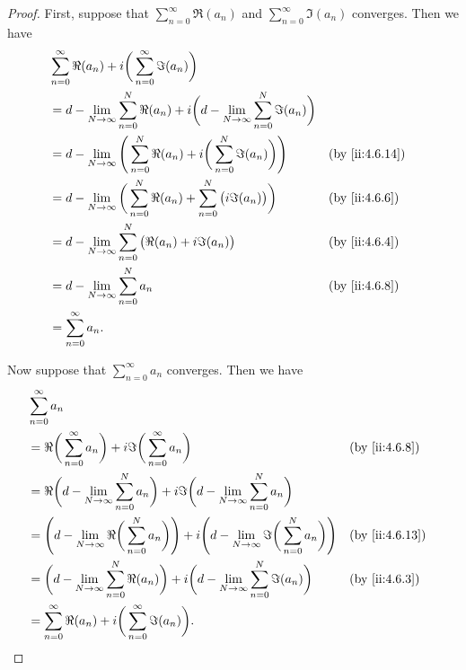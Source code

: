 \begin{proof}
  First, suppose that \(\sum_{n = 0}^\infty \Re(a_n)\) and \(\sum_{n = 0}^\infty \Im(a_n)\) converges.
  Then we have
  \begin{align*}
     & \sum_{n = 0}^\infty \Re(a_n) + i \bigg(\sum_{n = 0}^\infty \Im(a_n)\bigg)                                                             \\
     & = d - \lim_{N \to \infty} \sum_{n = 0}^N \Re(a_n) + i \bigg(d - \lim_{N \to \infty} \sum_{n = 0}^N \Im(a_n)\bigg)                     \\
     & = d - \lim_{N \to \infty} \Bigg(\sum_{n = 0}^N \Re(a_n) + i \bigg(\sum_{n = 0}^N \Im(a_n)\bigg)\Bigg)             &  & \by{ii:4.6.14} \\
     & = d - \lim_{N \to \infty} \bigg(\sum_{n = 0}^N \Re(a_n) + \sum_{n = 0}^N \big(i \Im(a_n)\big)\bigg)               &  & \by{ii:4.6.6}  \\
     & = d - \lim_{N \to \infty} \sum_{n = 0}^N \big(\Re(a_n) + i \Im(a_n)\big)                                          &  & \by{ii:4.6.4}  \\
     & = d - \lim_{N \to \infty} \sum_{n = 0}^N a_n                                                                      &  & \by{ii:4.6.8}  \\
     & = \sum_{n = 0}^\infty a_n.
  \end{align*}

  Now suppose that \(\sum_{n = 0}^\infty a_n\) converges.
  Then we have
  \begin{align*}
     & \sum_{n = 0}^\infty a_n                                                                                                                                               \\
     & = \Re\bigg(\sum_{n = 0}^\infty a_n\bigg) + i \Im\bigg(\sum_{n = 0}^\infty a_n\bigg)                                                               &  & \by{ii:4.6.8}  \\
     & = \Re\bigg(d - \lim_{N \to \infty} \sum_{n = 0}^N a_n\bigg) + i \Im\bigg(d - \lim_{N \to \infty} \sum_{n = 0}^N a_n\bigg)                                             \\
     & = \Bigg(d - \lim_{N \to \infty} \Re\bigg(\sum_{n = 0}^N a_n\bigg)\Bigg) + i \Bigg(d - \lim_{N \to \infty} \Im\bigg(\sum_{n = 0}^N a_n\bigg)\Bigg) &  & \by{ii:4.6.13} \\
     & = \bigg(d - \lim_{N \to \infty} \sum_{n = 0}^N \Re(a_n)\bigg) + i \bigg(d - \lim_{N \to \infty} \sum_{n = 0}^N \Im(a_n)\bigg)                     &  & \by{ii:4.6.3}  \\
     & = \sum_{n = 0}^\infty \Re(a_n) + i \bigg(\sum_{n = 0}^\infty \Im(a_n)\bigg).
  \end{align*}
\end{proof}

